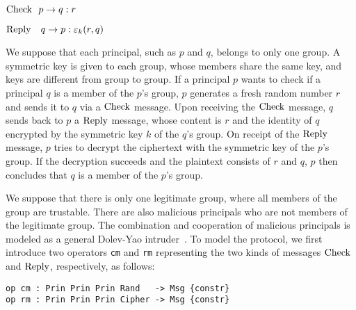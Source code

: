\documentclass[a4paper,fleqn]{cas-dc}
\begin{document}
	${\rm Check} \ \  p \rightarrow q : r$
	
	${\rm Reply}  \ \ \ q \rightarrow p : \varepsilon_k(r,q)$
	
	\noindent
We suppose that each principal, such as $p$ and $q$, belongs to only one group. A symmetric key is given to each group, whose members share the same key, and keys are different from group to group. If a principal $p$ wants to check if a principal $q$ is a member of the $p$'s group, $p$ generates a fresh random number $r$ and sends it to $q$ via a $\rm Check$ message. 
Upon receiving the $\rm Check$ message, $q$ sends back to $p$ a $\rm Reply$ message, whose content is $r$ and the identity of $q$ encrypted by the symmetric key $k$ of the $q$'s group. On receipt of the $\rm Reply$ message, $p$ tries to decrypt the ciphertext with the symmetric key of the $p$'s group. If the decryption succeeds and the plaintext consists of $r$ and $q$, $p$ then concludes that $q$ is a member of the $p$'s group. 

We suppose that there is only one legitimate group, where all members of the group are trustable.
There are also malicious principals who are not members of the legitimate group.
The combination and cooperation of malicious principals is modeled as a general Dolev-Yao intruder~\cite{DolevY83}. To model the protocol, we first introduce two operators \verb!cm! and \verb!rm! representing the two kinds of messages $\rm Check$ and $\rm Reply$, respectively, as follows:

\begin{small}
\begin{verbatim}
op cm : Prin Prin Prin Rand   -> Msg {constr}
op rm : Prin Prin Prin Cipher -> Msg {constr}
\end{verbatim}
\end{small}
\end{document}
